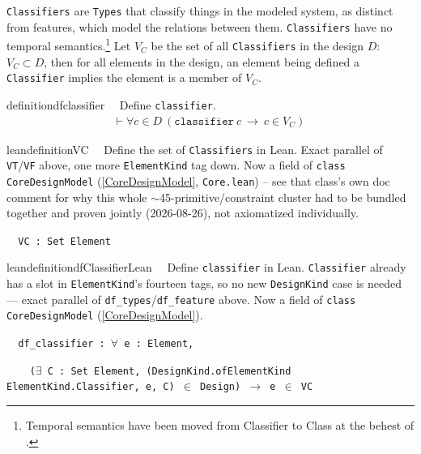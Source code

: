 




\pn \texttt{Classifiers} are \texttt{Types} that classify things in the modeled system, as distinct from features, which model the relations between them.  
\texttt{Classifiers} have no temporal semantics.\footnote{Temporal semantics have been moved from Classifier to Class at the behest of 
.}
Let $V_C$ be the set of all \texttt{Classifiers} in the design $D$:  $V_C \subset D$, then for all elements in the design, an element being defined a \texttt{Classifier} implies the element is a member of $V_C$.

\begin{restatable}{definition}{dfclassifier}~~  Define \texttt{classifier}.
\begin{align}
\vdash \forall c \in D~(\texttt{classifier}~c~ \rightarrow ~c \in V_C)~\label{eq:df-classifier}\tag{df-classifier}
\end{align}
\end{restatable}

\begin{restatable}{leandefinition}{VC}~~ Define the set of \texttt{Classifiers} in Lean. Exact
parallel of \texttt{VT}/\texttt{VF} above, one more \texttt{ElementKind} tag down. Now a field of
\texttt{class CoreDesignModel} (\ref{CoreDesignModel}, \texttt{Core.lean}) -- see that class's own doc
comment for why this whole $\sim$45-primitive/constraint cluster had to be bundled together and proven
jointly (2026-08-26), not axiomatized individually.

\texttt{~~VC : Set Element}
\label{VC}
\end{restatable}

\begin{restatable}{leandefinition}{dfClassifierLean}~~ Define \texttt{classifier} in Lean.
\texttt{Classifier} already has a slot in \texttt{ElementKind}'s fourteen tags, so no new \texttt{DesignKind}
case is needed --- exact parallel of \texttt{df\_types}/\texttt{df\_feature} above. Now a field of
\texttt{class CoreDesignModel} (\ref{CoreDesignModel}).

\texttt{~~df\_classifier : $\forall$ e : Element,}

\texttt{~~~~($\exists$ C : Set Element, (DesignKind.ofElementKind ElementKind.Classifier, e, C) $\in$ Design) $\to$ e $\in$ VC}
\label{df_classifier}
\end{restatable}


